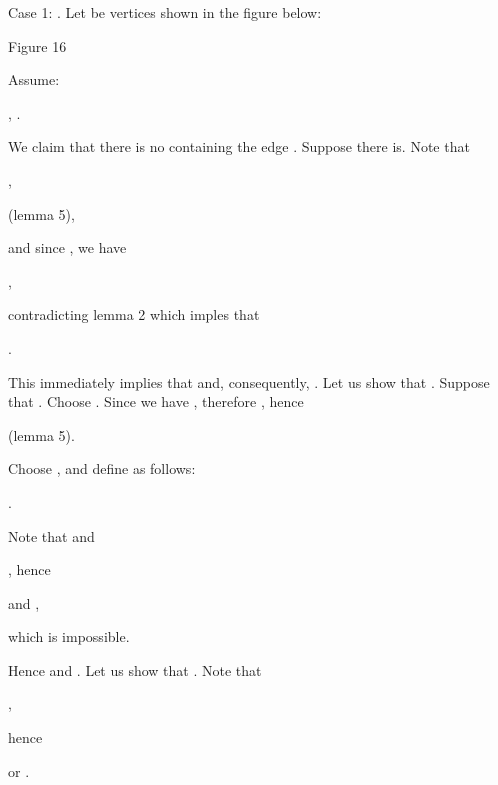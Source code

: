 \documentclass{article}
\begin{document}
Case 1: . Let  be vertices shown in
the figure below:

\begin{center}

Figure 16\bigskip
\end{center}

Assume:

\begin{center}
, .
\end{center}

We claim that there is no  containing the edge . Suppose there is. Note that

\begin{center}
,

 (lemma 5),
\end{center}

and since , we have

\begin{center}
,
\end{center}

contradicting lemma 2 which imples that

\begin{center}
.
\end{center}

This immediately implies that  and, consequently, . Let us show that . Suppose that . Choose . Since  we
have , therefore , hence

\begin{center}
 (lemma 5).
\end{center}

Choose , and define  as
follows:

\begin{center}
.
\end{center}

Note that  and

\begin{center}
, hence

 and ,
\end{center}

which is impossible.

Hence  and . Let us show that .
Note that

\begin{center}
,
\end{center}

hence

\begin{center}
 or .
\end{center}
\end{document}
